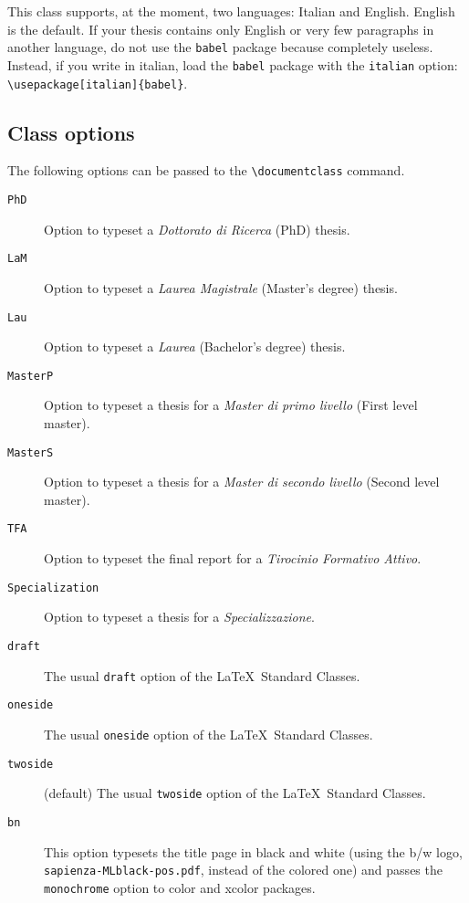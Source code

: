 \documentclass[a5paper,11pt]{article}
\newcommand{\bs}{\textbackslash}
\begin{document}
This class supports, at the moment, two languages: Italian and English. English is the default.
If your thesis contains only English or very few paragraphs in another language, do not use the \texttt{babel} package because completely useless. Instead, if you write in italian, load the \texttt{babel} package with the
\texttt{italian} option: \texttt{\bs usepackage[italian]\{babel\}}.

\subsection{Class options}
\label{class_options}
The following options can be passed to the \texttt{\bs documentclass} command.

\begin{description}
\item[\texttt{PhD}] Option to typeset a \textit{Dottorato di Ricerca} (PhD) thesis.
\item[\texttt{LaM}] Option to typeset a \textit{Laurea Magistrale} (Master's degree) thesis.
\item[\texttt{Lau}] Option to typeset a \textit{Laurea} (Bachelor's degree) thesis.
\item[\texttt{MasterP}] Option to typeset a thesis for a \textit{Master di primo livello} (First level master).
\item[\texttt{MasterS}] Option to typeset a thesis for a \textit{Master di secondo livello} (Second level master).
\item[\texttt{TFA}] Option to typeset the final report for a \textit{Tirocinio Formativo Attivo}.
\item[\texttt{Specialization}] Option to typeset a thesis for a \textit{Specializzazione}.

\item[\texttt{draft}] The usual \texttt{draft} option of the \LaTeX\ Standard Classes.
\item[\texttt{oneside}] The usual \texttt{oneside} option of the \LaTeX\ Standard Classes.
\item[\texttt{twoside}] (default) The usual \texttt{twoside} option of the \LaTeX\ Standard Classes.

\item[\texttt{bn}] This option typesets the title page in black and white
(using the b/w logo, \texttt{sapienza-MLblack-pos.pdf}, instead of the colored one) and passes the \texttt{monochrome} option to \textsf{color} and 
\textsf{xcolor} packages.


\end{description}
\end{document}
